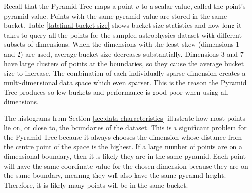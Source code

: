 \begin{table}[bp]
	\centering
	\caption{Pyramid Tree Bucket Size Statistics with Different Dimensions of Astrophysics Dataset}
	\label{tab:final-bucket-size}
\end{table}

Recall that the Pyramid Tree maps a point $v$ to a scalar value, called the point's pyramid value. Points with the same pyramid value are stored in the same bucket. Table \ref{tab:final-bucket-size} shows bucket size statistics and how long it takes to query all the points for the sampled astrophysics dataset with different subsets of dimensions. When the dimensions with the least skew (dimensions 1 and 2) are used, average bucket size decreases substantially. Dimensions 3 and 7 have large clusters of points at the boundaries, so they cause the average bucket size to increase. The combination of each individually sparse dimension creates a multi-dimensional data space which even sparser. This is the reason the Pyramid Tree produces so few buckets and performance is good poor when using all dimensions.

The histograms from Section \ref{sec:data-characteristics} illustrate how most points lie on, or close to, the boundaries of the dataset. This is a significant problem for the Pyramid Tree because it always chooses the dimension whose distance from the centre point of the space is the highest. If a large number of points are on a dimensional boundary, then it is likely they are in the same pyramid. Each point will have the same coordinate value for the chosen dimension because they are on the same boundary, meaning they will also have the same pyramid height. Therefore, it is likely many points will be in the same bucket.

